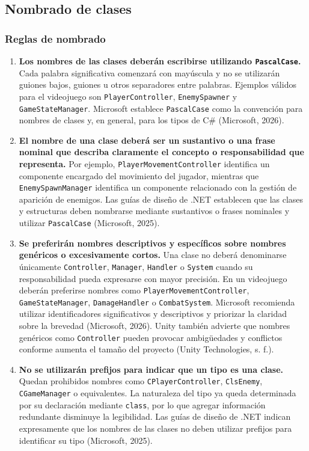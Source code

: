 \subsection{Nombrado de clases}

\subsubsection{Reglas de nombrado}

\begin{enumerate}
  \item \textbf{Los nombres de las clases deberán escribirse utilizando \texttt{PascalCase}.} Cada palabra significativa comenzará con mayúscula y no se utilizarán guiones bajos, guiones u otros separadores entre palabras. Ejemplos válidos para el videojuego son \texttt{PlayerController}, \texttt{EnemySpawner} y \texttt{GameStateManager}. Microsoft establece \texttt{PascalCase} como la convención para nombres de clases y, en general, para los tipos de C\# (Microsoft, 2026).

  \item \textbf{El nombre de una clase deberá ser un sustantivo o una frase nominal que describa claramente el concepto o responsabilidad que representa.} Por ejemplo, \texttt{PlayerMovementController} identifica un componente encargado del movimiento del jugador, mientras que \texttt{EnemySpawnManager} identifica un componente relacionado con la gestión de aparición de enemigos. Las guías de diseño de .NET establecen que las clases y estructuras deben nombrarse mediante sustantivos o frases nominales y utilizar \texttt{PascalCase} (Microsoft, 2025).

  \item \textbf{Se preferirán nombres descriptivos y específicos sobre nombres genéricos o excesivamente cortos.} Una clase no deberá denominarse únicamente \texttt{Controller}, \texttt{Manager}, \texttt{Handler} o \texttt{System} cuando su responsabilidad pueda expresarse con mayor precisión. En un videojuego deberán preferirse nombres como \texttt{PlayerMovementController}, \texttt{GameStateManager}, \texttt{DamageHandler} o \texttt{CombatSystem}. Microsoft recomienda utilizar identificadores significativos y descriptivos y priorizar la claridad sobre la brevedad (Microsoft, 2026). Unity también advierte que nombres genéricos como \texttt{Controller} pueden provocar ambigüedades y conflictos conforme aumenta el tamaño del proyecto (Unity Technologies, s. f.).

  \item \textbf{No se utilizarán prefijos para indicar que un tipo es una clase.} Quedan prohibidos nombres como \texttt{CPlayerController}, \texttt{ClsEnemy}, \texttt{CGameManager} o equivalentes. La naturaleza del tipo ya queda determinada por su declaración mediante \texttt{class}, por lo que agregar información redundante disminuye la legibilidad. Las guías de diseño de .NET indican expresamente que los nombres de las clases no deben utilizar prefijos para identificar su tipo (Microsoft, 2025).


\end{enumerate}
